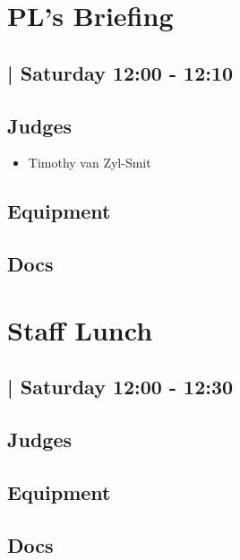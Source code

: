 \documentclass[10pt]{article}
\begin{document}
		\begin{minipage}{\linewidth}
		\setcounter{section}{20}
	\section{PL's Briefing }
	\subsection*{ | Saturday 12:00 - 12:10}

	

	\begin{multicols}{2}
	\subsection*{\faUsers \: Judges}
	\begin{itemize}
			\item Timothy van Zyl-Smit
		\end{itemize}
	\columnbreak
	\subsection*{\faWrench \: Equipment}
	        \vfill\null
        \subsection*{\faFile \: Docs}
     	\end{multicols}


	\vspace{1cm}
	\end{minipage}

		\begin{minipage}{\linewidth}
		\setcounter{section}{21}
	\section{Staff Lunch }
	\subsection*{ | Saturday 12:00 - 12:30}

	

	\begin{multicols}{2}
	\subsection*{\faUsers \: Judges}
	\begin{itemize}
		\end{itemize}
	\columnbreak
	\subsection*{\faWrench \: Equipment}
	        \vfill\null
        \subsection*{\faFile \: Docs}
     	\end{multicols}


	\vspace{1cm}
	\end{minipage}
\end{document}

